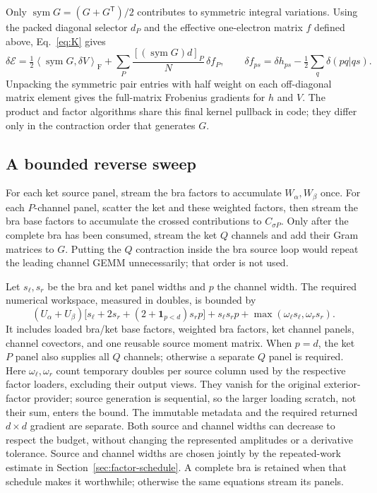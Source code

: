 \documentclass[11pt,a4paper]{article}
\newcommand{\Tr}{^{\mathsf T}}
\newcommand{\ip}[2]{\left\langle #1,#2\right\rangle_{\mathrm F}}
\begin{document}
Only $\operatorname{sym}G=(G+G\Tr)/2$ contributes to symmetric integral
variations. Using the packed diagonal selector $d_P$ and the effective
one-electron matrix $f$ defined above, Eq.~\eqref{eq:K} gives
\begin{equation}
 \delta\mathscr E=
 \tfrac12\ip{\operatorname{sym}G}{\delta V}
 +\sum_P\frac{[(\operatorname{sym}G)d]_P}{N}\,\delta f_P,
 \qquad
 \delta f_{ps}=\delta h_{ps}-\tfrac12\sum_q\delta(pq|qs).
\end{equation}
Unpacking the symmetric pair entries with half weight on each off-diagonal
matrix element gives the full-matrix Frobenius gradients for $h$ and $V$.
The product and factor algorithms share this final kernel pullback in code;
they differ only in the contraction order that generates $G$.

\subsection{A bounded reverse sweep}

For each ket source panel, stream the bra factors to accumulate
$W_\alpha,W_\beta$ once. For each $P$-channel panel, scatter the ket
and these weighted factors, then stream the bra base factors to accumulate
the crossed contributions to $C_{\sigma P}$. Only after the complete bra has been
consumed, stream the ket $Q$ channels and add their Gram matrices to $G$.
Putting the $Q$ contraction inside the bra source loop would repeat the
leading channel GEMM unnecessarily; that order is not used.

Let $s_\ell,s_r$ be the bra and ket panel widths and $p$ the channel width.
The required numerical workspace, measured in doubles, is bounded by
\begin{equation}
 (U_\alpha+U_\beta)
 \bigl[s_\ell+2s_r+(2+\mathbf 1_{p<d})s_rp\bigr]
 +s_\ell s_rp+\max(\omega_\ell s_\ell,\omega_r s_r).
\end{equation}
It includes loaded bra/ket base factors, weighted bra factors, ket channel
panels, channel covectors, and one reusable source moment matrix.
When $p=d$, the ket $P$ panel also supplies all $Q$ channels; otherwise
a separate $Q$ panel is required. Here $\omega_\ell,\omega_r$ count temporary doubles per source
column used by the respective factor loaders, excluding their output views.
They vanish for the original exterior-factor provider; source generation is
sequential, so the larger loading scratch, not their sum, enters the bound.
The immutable metadata and the required returned $d\times d$ gradient are
separate. Both source
and channel widths can decrease to respect the budget, without changing
the represented amplitudes or a derivative tolerance.
Source and channel widths are chosen jointly by the repeated-work estimate
in Section~\ref{sec:factor-schedule}. A complete bra is retained when that
schedule makes it worthwhile; otherwise the same equations stream its panels.
\end{document}
